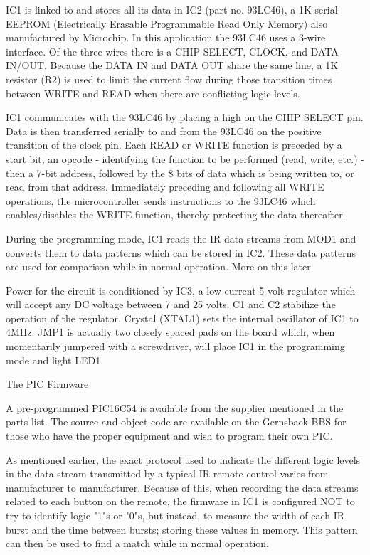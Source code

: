      IC1 is linked to and stores all its data in IC2 (part no.
93LC46), a 1K serial EEPROM (Electrically Erasable Programmable Read
Only Memory) also manufactured by Microchip. In this application the
93LC46 uses a 3-wire interface. Of the three wires there is a CHIP
SELECT, CLOCK, and DATA IN/OUT. Because the DATA IN and DATA OUT
share the same line, a 1K resistor (R2) is used to limit the current
flow during those transition times between WRITE and READ when there
are conflicting logic levels.

     IC1 communicates with the 93LC46 by placing a high on the CHIP
SELECT pin. Data is then transferred serially to and from the 93LC46
on the positive transition of the clock pin. Each READ or WRITE
function is preceded by a start bit, an opcode - identifying the
function to be performed (read, write, etc.) - then a 7-bit address,
followed by the 8 bits of data which is being written to, or read
from that address. Immediately preceding and following all WRITE
operations, the microcontroller sends instructions to the 93LC46
which enables/disables the WRITE function, thereby protecting the
data thereafter.

     During the programming mode, IC1 reads the IR data streams from
MOD1 and converts them to data patterns which can be stored in IC2.
These data patterns are used for comparison while in normal
operation. More on this later.

     Power for the circuit is conditioned by IC3, a low current
5-volt regulator which will accept any DC voltage between 7 and 25
volts. C1 and C2 stabilize the operation of the regulator. Crystal
(XTAL1) sets the internal oscillator of IC1 to 4MHz. JMP1 is actually
two closely spaced pads on the board which, when momentarily jumpered
with a screwdriver, will place IC1 in the programming mode and light
LED1.

The PIC Firmware

     A pre-programmed PIC16C54 is available from the supplier
mentioned in the parts list. The source and object code are available
on the Gernsback BBS for those who have the proper equipment and wish
to program their own PIC.

     As mentioned earlier, the exact protocol used to indicate the
different logic levels in the data stream transmitted by a typical IR
remote control varies from manufacturer to manufacturer. Because of
this, when recording the data streams related to each button on the
remote, the firmware in IC1 is configured NOT to try to identify
logic "1"s or "0"s, but instead, to measure the width of each IR
burst and the time between bursts; storing these values in memory.
This pattern can then be used to find a match while in normal
operation.

